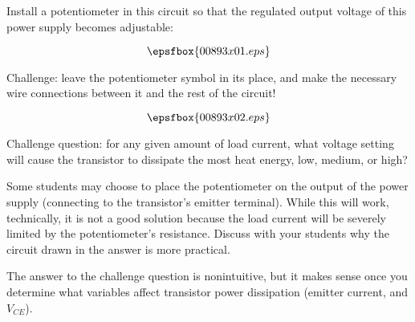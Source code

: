 

Install a potentiometer in this circuit so that the regulated output voltage of this power supply becomes adjustable:

$$\epsfbox{00893x01.eps}$$

Challenge: leave the potentiometer symbol in its place, and make the necessary wire connections between it and the rest of the circuit!







$$\epsfbox{00893x02.eps}$$

\vskip 10pt

Challenge question: for any given amount of load current, what voltage setting will cause the transistor to dissipate the most heat energy, low, medium, or high?







Some students may choose to place the potentiometer on the output of the power supply (connecting to the transistor's emitter terminal).  While this will work, technically, it is not a good solution because the load current will be severely limited by the potentiometer's resistance.  Discuss with your students why the circuit drawn in the answer is more practical.

The answer to the challenge question is nonintuitive, but it makes sense once you determine what variables affect transistor power dissipation (emitter current, and $V_{CE}$).




